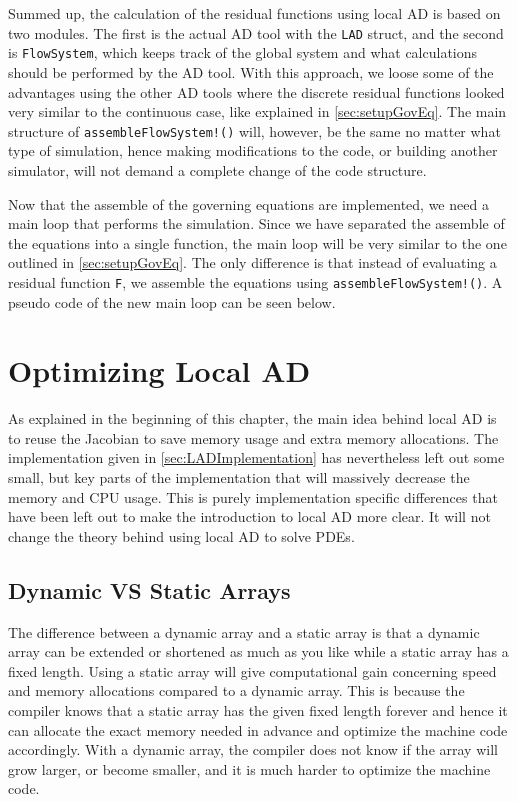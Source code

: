 Summed up, the calculation of the residual functions using local AD is based on two modules. The first is the actual AD tool with the \texttt{LAD} struct, and the second is \texttt{FlowSystem}, which keeps track of the global system and what calculations should be performed by the AD tool. With this approach, we loose some of the advantages using the other AD tools where the discrete residual functions looked very similar to the continuous case, like explained in \autoref{sec:setupGovEq}. The main structure of \texttt{assembleFlowSystem!()} will, however, be the same no matter what type of simulation, hence making modifications to the code, or building another simulator, will not demand a complete change of the code structure.

Now that the assemble of the governing equations are implemented, we need a main loop that performs the simulation. Since we have separated the assemble of the equations into a single function, the main loop will be very similar to the one outlined in \autoref{sec:setupGovEq}. The only difference is that instead of evaluating a residual function \texttt{F}, we assemble the equations using \texttt{assembleFlowSystem!()}. A pseudo code of the new main loop can be seen below. 


\section{Optimizing Local AD}
\label{sec:optimizingLocalAD}
As explained in the beginning of this chapter, the main idea behind local AD is to reuse the Jacobian to save memory usage and extra memory allocations. The implementation given in \autoref{sec:LADImplementation} has nevertheless left out some small, but key parts of the implementation that will massively decrease the memory and CPU usage. This is purely implementation specific differences that have been left out to make the introduction to local AD more clear. It will not change the theory behind using local AD to solve PDEs.

\subsection{Dynamic VS Static Arrays}
The difference between a dynamic array and a static array is that a dynamic array can be extended or shortened as much as you like while a static array has a fixed length. Using a static array will give computational gain concerning speed and memory allocations compared to a dynamic array. This is because the compiler knows that a static array has the given fixed length forever and hence it can allocate the exact memory needed in advance and optimize the machine code accordingly. With a dynamic array, the compiler does not know if the array will grow larger, or become smaller, and it is much harder to optimize the machine code. 

